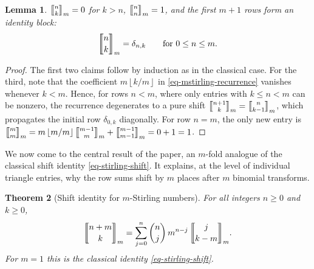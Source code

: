 \documentclass[a4paper]{amsart}
\numberwithin{equation}{section}
\newcommand{\mStirling}[0]{\genfrac{\llbracket}{\rrbracket}{0pt}{}}
\newcommand{\floor}[1]{\left\lfloor #1 \right\rfloor}
\newtheorem{theorem}{Theorem}[section]
\newtheorem{lemma}[theorem]{Lemma}
\begin{document}
\begin{lemma}\label{lem-identity-rows}
$\mStirling{n}{k}_m = 0$ for $k > n$, $\mStirling{n}{n}_m = 1$, and the first $m+1$ rows form an identity block:
\[
\mStirling{n}{k}_m = \delta_{n,k} \qquad \text{for } 0 \leq n \leq m.
\]
\end{lemma}
\begin{proof}
The first two claims follow by induction as in the classical case. For the third, note that the coefficient $m\floor{k/m}$ in \eqref{eq-mstirling-recurrence} vanishes whenever $k < m$. Hence, for rows $n < m$, where only entries with $k \leq n < m$ can be nonzero, the recurrence degenerates to a pure shift $\mStirling{n+1}{k}_m = \mStirling{n}{k-1}_m$, which propagates the initial row $\delta_{0,k}$ diagonally. For row $n = m$, the only new entry is $\mStirling{m}{m}_m = m\floor{m/m}\mStirling{m-1}{m}_m + \mStirling{m-1}{m-1}_m = 0 + 1 = 1$.
\end{proof}

We now come to the central result of the paper, an $m$-fold analogue of the classical shift identity \eqref{eq-stirling-shift}. It explains, at the level of individual triangle entries, why the row sums shift by $m$ places after $m$ binomial transforms.

\begin{theorem}[Shift identity for $m$-Stirling numbers]\label{thm-shift-identity}
For all integers $n \geq 0$ and $k \geq 0$,
\begin{equation}\label{eq-shift-identity}
\mStirling{n+m}{k}_m = \sum_{j=0}^{n}\binom{n}{j}\, m^{n-j}\, \mStirling{j}{k-m}_m.
\end{equation}
For $m = 1$ this is the classical identity \eqref{eq-stirling-shift}.
\end{theorem}
\end{document}
